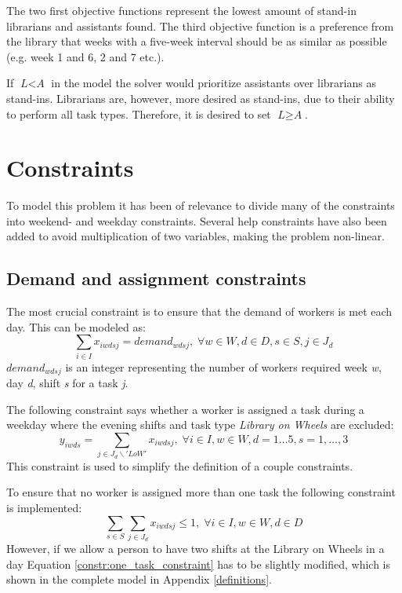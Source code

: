 The two first objective functions represent the lowest amount of stand-in librarians and assistants found. The third objective function is a preference from the library that weeks with a five-week interval should be as similar as possible (e.g. week 1 and 6, 2 and 7 etc.).

If $\textit{L} < \textit{A}$ in the model the solver would prioritize assistants over librarians as stand-ins. Librarians are, however, more desired as stand-ins, due to their ability to perform all task types. Therefore, it is desired to set $\textit{L} \geq \textit{A}$.

\section{Constraints} \label{constraints}
To model this problem it has been of relevance to divide many of the constraints into weekend- and weekday constraints. Several help constraints have also been added to avoid multiplication of two variables, making the problem non-linear.

\subsection{Demand and assignment constraints} \label{section:demand_ass_constraints}
The most crucial constraint is to ensure that the demand of workers is met each day. This can be modeled as:
\begin{equation}
\sum_{i \in I} x_{iwdsj} = demand_{wdsj}, \; \forall w\in W,d\in D,s\in S,j\in J_d
\end{equation}
$demand_{wdsj}$ is an integer representing the number of workers required week \textit{w}, day \textit{d}, shift \textit{s} for a task \textit{j}.

The following constraint says whether a worker is assigned a task during a weekday where the evening shifts and task type \textit{Library on Wheels} are excluded:
\begin{equation} \label{constr:y_assign}
y_{iwds} = \sum_{j \in J_d\backslash 'LoW'} x_{iwdsj}, \; \forall i \in I, w \in W, d = 1 \ldots 5, s = 1,\ldots,3
\end{equation}
This constraint is used to simplify the definition of a couple constraints.

To ensure that no worker is assigned more than one task the following constraint is implemented:
\begin{equation} \label{constr:one_task_constraint}
\sum_{s\in S}\sum_{j\in J_d} x_{iwdsj} \leq 1, \; \forall i\in I, w \in W, d\in D
\end{equation}
However, if we allow a person to have two shifts at the Library on Wheels in a day Equation \ref{constr:one_task_constraint} has to be slightly modified, which is shown in the complete model in Appendix \ref{definitions}.

